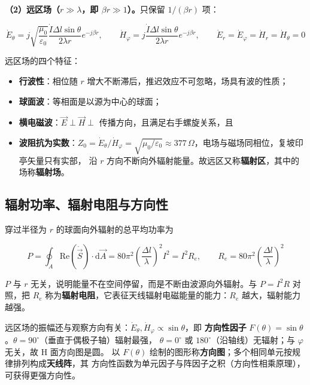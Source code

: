 \textbf{（2）远区场（$r\gg\lambda$，即 $\beta r\gg1$）。}只保留 $1/(\beta r)$ 项：
\begin{formulaBox}
\[
\dot{E}_\theta=j\sqrt{\frac{\mu_0}{\varepsilon_0}}
\frac{\dot{I}\Delta l\sin\theta}{2\lambda r}e^{-j\beta r},
\qquad
\dot{H}_\varphi=j\frac{\dot{I}\Delta l\sin\theta}{2\lambda r}e^{-j\beta r},
\qquad
\dot{E}_r=\dot{E}_\varphi=\dot{H}_r=\dot{H}_\theta=0
\]
\end{formulaBox}
远区场的四个特征：
\begin{itemize}
  \item \textbf{行波性}：相位随 $r$ 增大不断滞后，推迟效应不可忽略，场具有波的性质；
  \item \textbf{球面波}：等相面是以源为中心的球面；
  \item \textbf{横电磁波}：$\vec{E}\perp\vec{H}\perp$ 传播方向，且满足右手螺旋关系，且
  \item \textbf{波阻抗为实数}：$Z_0=\dot{E}_\theta/\dot{H}_\varphi
  =\sqrt{\mu_0/\varepsilon_0}\approx377\,\Omega$，电场与磁场同相位，复坡印亭矢量只有实部，
  沿 $r$ 方向不断向外辐射能量。故远区又称\textbf{辐射区}，其中的场称\textbf{辐射场}。
\end{itemize}

\subsection{辐射功率、辐射电阻与方向性}

穿过半径为 $r$ 的球面向外辐射的总平均功率为
\begin{formulaBox}
\[
P=\oint_{A}\mathrm{Re}(\dot{\vec{S}})\cdot \mathrm{d}\vec{A}
=80\pi^{2}\left(\frac{\Delta l}{\lambda}\right)^{2}I^{2}=I^{2}R_e,
\qquad
R_e=80\pi^{2}\left(\frac{\Delta l}{\lambda}\right)^{2}
\]
\end{formulaBox}
$P$ 与 $r$ 无关，说明能量不在空间停留，而是不断由波源向外辐射。与 $P=I^{2}R$ 对照，把
$R_e$ 称为\textbf{辐射电阻}，它表征天线辐射电磁能量的能力：$R_e$ 越大，辐射能力越强。

远区场的振幅还与观察方向有关：$\dot{E}_\theta,\dot{H}_\varphi\propto\sin\theta$，即
\textbf{方向性因子} $F(\theta)=\sin\theta$。$\theta=90^{\circ}$（垂直于偶极子轴）辐射最强，
$\theta=0^{\circ}$ 或 $180^{\circ}$（沿轴线）无辐射；与 $\varphi$ 无关，故 H 面方向图是圆。
以 $F(\theta)$ 绘制的图形称\textbf{方向图}；多个相同单元按规律排列构成\textbf{天线阵}，其
方向性函数为单元因子与阵因子之积（方向性相乘原理），可获得更强方向性。

